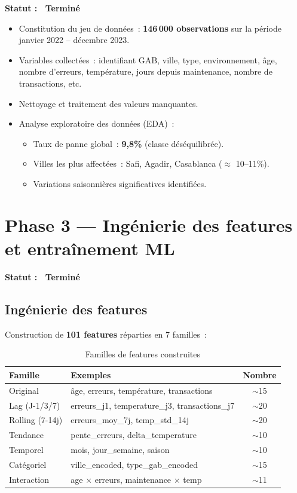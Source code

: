\documentclass[a4paper,12pt]{report}
\newcommand{\done}{\textcolor{done}{\checkmark\ Terminé}}
\begin{document}
\textbf{Statut : \done}

\begin{itemize}
    \item Constitution du jeu de données~: \textbf{146\,000 observations} sur la période janvier 2022 – décembre 2023.
    \item Variables collectées~: identifiant GAB, ville, type, environnement, âge, nombre d'erreurs, température, jours depuis maintenance, nombre de transactions, etc.
    \item Nettoyage et traitement des valeurs manquantes.
    \item Analyse exploratoire des données (EDA)~:
    \begin{itemize}
        \item Taux de panne global~: \textbf{9,8\%} (classe déséquilibrée).
        \item Villes les plus affectées~: Safi, Agadir, Casablanca ($\approx$ 10–11\%).
        \item Variations saisonnières significatives identifiées.
    \end{itemize}
\end{itemize}

\section{Phase 3 — Ingénierie des features et entraînement ML}

\textbf{Statut : \done}

\subsection{Ingénierie des features}

Construction de \textbf{101 features} réparties en 7 familles~:

\begin{table}[h!]
\centering
\renewcommand{\arraystretch}{1.2}
\begin{tabular}{|l|l|c|}
\hline
\rowcolor{bpmblue!10}
\textbf{Famille} & \textbf{Exemples} & \textbf{Nombre} \\
\hline
Original & âge, erreurs, température, transactions & $\sim$15 \\
\hline
Lag (J-1/3/7) & erreurs\_j1, temperature\_j3, transactions\_j7 & $\sim$20 \\
\hline
Rolling (7-14j) & erreurs\_moy\_7j, temp\_std\_14j & $\sim$20 \\
\hline
Tendance & pente\_erreurs, delta\_temperature & $\sim$10 \\
\hline
Temporel & mois, jour\_semaine, saison & $\sim$10 \\
\hline
Catégoriel & ville\_encoded, type\_gab\_encoded & $\sim$15 \\
\hline
Interaction & age $\times$ erreurs, maintenance $\times$ temp & $\sim$11 \\
\hline
\end{tabular}
\caption{Familles de features construites}
\end{table}
\end{document}
